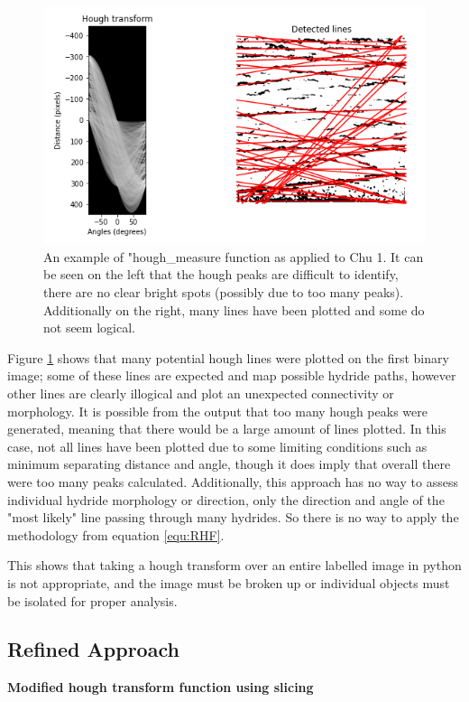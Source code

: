 \documentclass{article}
\begin{document}
    \begin{figure}[H]
        \centering
        \includegraphics[scale=0.7]{Figures/houghtrans_initial.png}
        \caption{An example of "hough\_measure function as applied to Chu 1. It can be seen on the left that the hough peaks are difficult to identify, there are no clear bright spots (possibly due to too many peaks). Additionally on the right, many lines have been plotted and some do not seem logical.}
        \label{fig:hough_initial}
    \end{figure}
    
    \noindent Figure \ref{fig:hough_initial} shows that many potential hough lines were plotted on the first binary image; some of these lines are expected and map possible hydride paths, however other lines are clearly illogical and plot an unexpected connectivity or morphology. It is possible from the output that too many hough peaks were generated, meaning that there would be a large amount of lines plotted. In this case, not all lines have been plotted due to some limiting conditions such as minimum separating distance and angle, though it does imply that overall there were too many peaks calculated. Additionally, this approach has no way to assess individual hydride morphology or direction, only the direction and angle of the "most likely" line passing through many hydrides. So there is no way to apply the methodology from equation \ref{equ:RHF}.
    
    This shows that taking a hough transform over an entire labelled image in python is not appropriate, and the image must be broken up or individual objects must be isolated for proper analysis.
   

\subsection{Refined Approach}
\textbf{Modified hough transform function using slicing}
\end{document}
